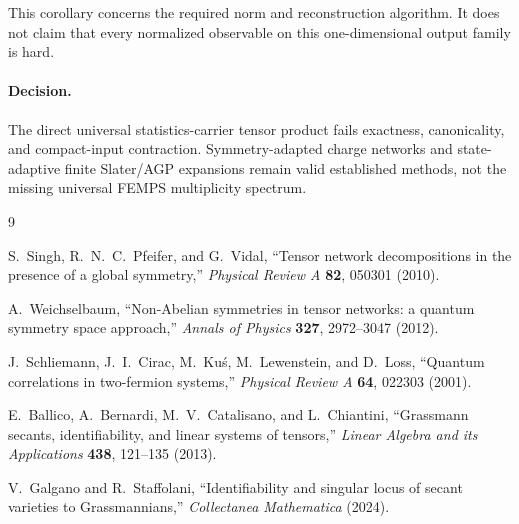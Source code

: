 \documentclass[11pt]{article}
\begin{document}
This corollary concerns the required norm and reconstruction algorithm. It does
not claim that every normalized observable on this one-dimensional output
family is hard.

\paragraph{Decision.}
The direct universal statistics-carrier tensor product fails exactness,
canonicality, and compact-input contraction. Symmetry-adapted charge networks
and state-adaptive finite Slater/AGP expansions remain valid established
methods, not the missing universal FEMPS multiplicity spectrum.

\begin{thebibliography}{9}

S.~Singh, R.~N.~C.~Pfeifer, and G.~Vidal,
``Tensor network decompositions in the presence of a global symmetry,''
\emph{Physical Review A} \textbf{82}, 050301 (2010).

A.~Weichselbaum,
``Non-Abelian symmetries in tensor networks: a quantum symmetry space
approach,'' \emph{Annals of Physics} \textbf{327}, 2972--3047 (2012).

J.~Schliemann, J.~I.~Cirac, M.~Ku\'s, M.~Lewenstein, and D.~Loss,
``Quantum correlations in two-fermion systems,''
\emph{Physical Review A} \textbf{64}, 022303 (2001).

E.~Ballico, A.~Bernardi, M.~V.~Catalisano, and L.~Chiantini,
``Grassmann secants, identifiability, and linear systems of tensors,''
\emph{Linear Algebra and its Applications} \textbf{438}, 121--135 (2013).

V.~Galgano and R.~Staffolani,
``Identifiability and singular locus of secant varieties to Grassmannians,''
\emph{Collectanea Mathematica} (2024).

\end{thebibliography}
\end{document}
